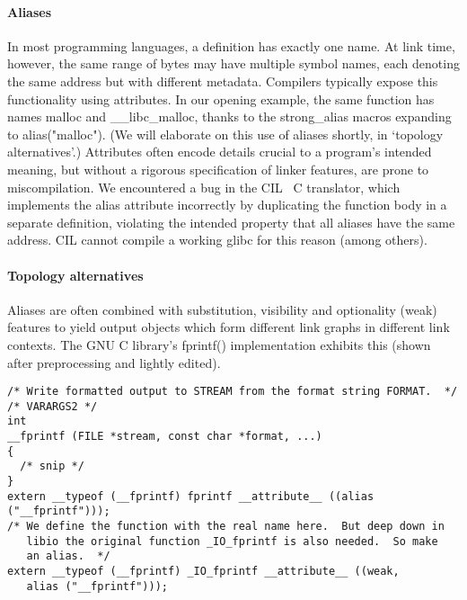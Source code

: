 \documentclass[preprint,10pt]{sigplanconf-pldi16}
\newcommand{\mynote}[2]{}
\newcommand{\sk}[1]{\mynote{SK}{#1}}
\newcommand{\ps}[1]{\mynote{PS}{#1}}
\begin{document}



\paragraph{Aliases}
In most programming languages, a definition has exactly one name. 
At link time, however, the same range of bytes may have multiple symbol names, 
each denoting the same address but with different metadata.
Compilers typically expose this functionality using attributes.
In our opening example, the same function has names \textsf{malloc} and \textsf{\_\_libc\_malloc},
thanks to the \textsf{strong\_alias} macros expanding to \textsf{alias("malloc")}.
(We will elaborate on this use of aliases shortly, in `topology alternatives'.)
Attributes often encode details crucial to a program's intended meaning,
but without a rigorous specification of linker features, are prone to miscompilation.
We encountered a bug in the CIL~\cite{necula-cil-2002} C translator, which implements the \textsf{alias} attribute incorrectly by duplicating the function body in a separate definition,
violating the intended property that all aliases have the same address.
CIL cannot compile a working \textsf{glibc} for this reason (among others).

\paragraph{Topology alternatives}
Aliases are often combined with substitution, visibility and optionality (weak) features 
to yield output objects which 
form different link graphs in different link contexts.
The GNU C library's \textsf{fprintf()} implementation
exhibits this (shown after preprocessing and lightly edited).

{\scriptsize\begin{lstlisting}
/* Write formatted output to STREAM from the format string FORMAT.  */
/* VARARGS2 */
int
__fprintf (FILE *stream, const char *format, ...)
{
  /* snip */
}
extern __typeof (__fprintf) fprintf __attribute__ ((alias ("__fprintf")));
/* We define the function with the real name here.  But deep down in
   libio the original function _IO_fprintf is also needed.  So make
   an alias.  */
extern __typeof (__fprintf) _IO_fprintf __attribute__ ((weak, 
   alias ("__fprintf")));
\end{lstlisting}}
\end{document}
